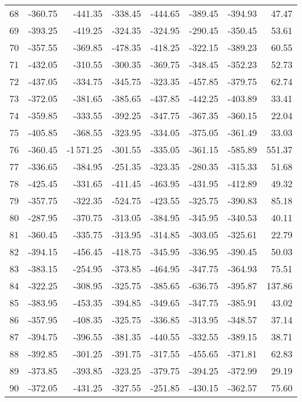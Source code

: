 \begin{longtable}{rrrrrrrr}
68 & -360.75 & -441.35 & -338.45 & -444.65 & -389.45 & -394.93 & 47.47  \\
69 & -393.25 & -419.25 & -324.35 & -324.95 & -290.45 & -350.45 & 53.61  \\
70 & -357.55 & -369.85 & -478.35 & -418.25 & -322.15 & -389.23 & 60.55  \\
71 & -432.05 & -310.55 & -300.35 & -369.75 & -348.45 & -352.23 & 52.73  \\
72 & -437.05 & -334.75 & -345.75 & -323.35 & -457.85 & -379.75 & 62.74  \\
73 & -372.05 & -381.65 & -385.65 & -437.85 & -442.25 & -403.89 & 33.41  \\
74 & -359.85 & -333.55 & -392.25 & -347.75 & -367.35 & -360.15 & 22.04  \\
75 & -405.85 & -368.55 & -323.95 & -334.05 & -375.05 & -361.49 & 33.03  \\
76 & -360.45 & -1\,571.25 & -301.55 & -335.05 & -361.15 & -585.89 & 551.37  \\
77 & -336.65 & -384.95 & -251.35 & -323.35 & -280.35 & -315.33 & 51.68  \\
78 & -425.45 & -331.65 & -411.45 & -463.95 & -431.95 & -412.89 & 49.32  \\
79 & -357.75 & -322.35 & -524.75 & -423.55 & -325.75 & -390.83 & 85.18  \\
80 & -287.95 & -370.75 & -313.05 & -384.95 & -345.95 & -340.53 & 40.11  \\
81 & -360.45 & -335.75 & -313.95 & -314.85 & -303.05 & -325.61 & 22.79  \\
82 & -394.15 & -456.45 & -418.75 & -345.95 & -336.95 & -390.45 & 50.03  \\
83 & -383.15 & -254.95 & -373.85 & -464.95 & -347.75 & -364.93 & 75.51  \\
84 & -322.25 & -308.95 & -325.75 & -385.65 & -636.75 & -395.87 & 137.86  \\
85 & -383.95 & -453.35 & -394.85 & -349.65 & -347.75 & -385.91 & 43.02  \\
86 & -357.95 & -408.35 & -325.75 & -336.85 & -313.95 & -348.57 & 37.14  \\
87 & -394.75 & -396.55 & -381.35 & -440.55 & -332.55 & -389.15 & 38.71  \\
88 & -392.85 & -301.25 & -391.75 & -317.55 & -455.65 & -371.81 & 62.83  \\
89 & -373.85 & -393.85 & -323.25 & -379.75 & -394.25 & -372.99 & 29.19  \\
90 & -372.05 & -431.25 & -327.55 & -251.85 & -430.15 & -362.57 & 75.60  \\

\end{longtable}
